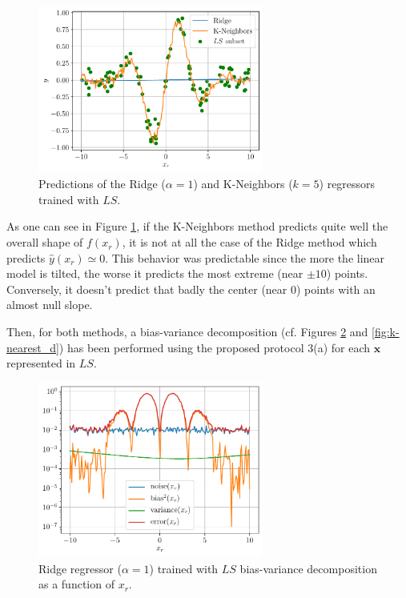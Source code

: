 \documentclass[a4paper, 12pt]{article}
\begin{document}
\begin{enumerate}[label=(\alph*)]
        \begin{figure}[H]
            \centering
            \includegraphics[width=0.66\textwidth]{resources/pdf/predictions.pdf}
            \vspace{-1em}
            \caption{Predictions of the Ridge ($\alpha = 1$) and K-Neighbors ($k = 5$) regressors trained with $LS$.}
            \label{fig:predictions}
        \end{figure}
        
        As one can see in Figure \ref{fig:predictions}, if the K-Neighbors method predicts quite well the overall shape of $f(x_r)$, it is not at all the case of the Ridge method which predicts $\hat{y}(x_r) \simeq 0$. This behavior was predictable since the more the linear model is tilted, the worse it predicts the most extreme (near $\pm 10$) points. Conversely, it doesn't predict that badly the center (near $0$) points with an almost null slope.

        Then, for both methods, a bias-variance decomposition (cf. Figures \ref{fig:ridge_d} and \ref{fig:k-nearest_d}) has been performed using the proposed protocol 3(a) for each $\bm{x}$ represented in $LS$.
        
        \begin{figure}[h]
            \centering
            \includegraphics[width=0.66\textwidth]{resources/pdf/rrg.pdf}
            \vspace{-1em}
            \caption{Ridge regressor ($\alpha = 1$) trained with $LS$ bias-variance decomposition as a function of $x_r$.}
            \label{fig:ridge_d}
        \end{figure}
        

\end{enumerate}
\end{document}
